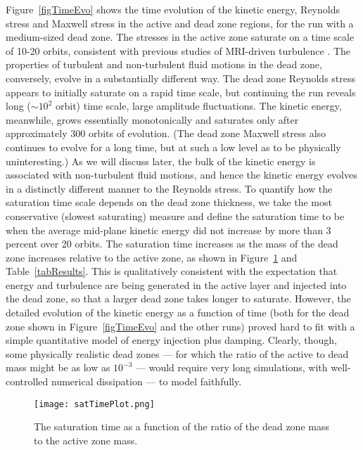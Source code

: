 Figure~\ref{figTimeEvo} shows the time evolution of the kinetic energy, Reynolds stress and Maxwell stress in the 
active and dead zone regions, for the run with a medium-sized dead zone. The stresses in the active zone saturate on a time scale of 10-20 orbits, consistent with previous studies of MRI-driven turbulence \cite[e.g.,][]{simon09}. The properties of turbulent  and non-turbulent fluid motions in the dead zone, conversely, evolve in a 
substantially different way. The dead zone Reynolds stress appears to initially saturate on a rapid time scale, but 
continuing the run reveals long ($\sim 10^2$ orbit) time scale, large amplitude fluctuations. The kinetic energy, 
meanwhile, grows essentially monotonically and saturates only after approximately 300 orbits of evolution. (The 
dead zone Maxwell stress also continues to evolve for a long time, but at such a low level as to be physically 
uninteresting.) As 
we will discuss later, the bulk of the kinetic energy is associated with non-turbulent fluid motions, and hence the 
kinetic energy evolves in a distinctly different manner to the Reynolds stress. To quantify how the saturation 
time scale depends on the dead zone thickness, we take the most conservative (slowest saturating) measure  
and define the saturation time to be when the average mid-plane kinetic energy did not increase by more than 
3 percent over 20 orbits. The saturation time increases as the mass of the dead zone increases relative to the 
active zone, as shown in Figure~\ref{figSatTime} and Table~\ref{tabResults}. This is qualitatively consistent with the 
expectation that energy and turbulence are being generated in the active layer and injected into the dead zone, so that a larger dead zone takes longer to saturate. However, the detailed evolution of the kinetic energy as a function of 
time (both for the dead zone shown in Figure~\ref{figTimeEvo} and the other runs) proved hard to fit with a 
simple quantitative model of energy injection plus damping. Clearly, though, some physically realistic dead zones --- for which the ratio of the active to dead mass might be as low as $10^{-3}$ --- would require very long simulations, with well-controlled numerical dissipation --- to model faithfully.

\begin{figure}[p]
\centering
\texttt{[image: satTimePlot.png]}
\caption{The saturation time as a function of the ratio of the dead zone mass to the active zone mass. }
\label{figSatTime}
\end{figure}


